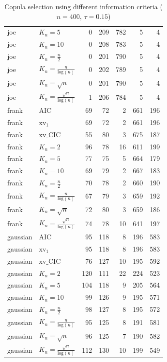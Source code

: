\begin{table}[htbp]
\begin{tabular}{llrrrrr}
  joe & $K_{n}=5$ & 0 & 209 & 782 & 5 & 4 \\ 
  joe & $K_{n}=10$ & 0 & 208 & 783 & 5 & 4 \\ 
  joe & $K_{n}=\tfrac{n}{2}$ & 0 & 201 & 790 & 5 & 4 \\ 
  joe & $K_{n}=\tfrac{n}{\text{log}(n)}$ & 0 & 202 & 789 & 5 & 4 \\ 
  joe & $K_{n}=\sqrt{n}$ & 0 & 201 & 790 & 5 & 4 \\ 
  joe & $K_{n}=\tfrac{\sqrt{n}}{\text{log}(n)}$ & 1 & 206 & 784 & 5 & 4 \\ 
   \hdashline
frank & AIC & 69 & 72 & 2 & 661 & 196 \\ 
  frank & $\text{xv}_{1}$ & 69 & 72 & 2 & 661 & 196 \\ 
  frank & $\text{xv}\_\text{CIC}$ & 55 & 80 & 3 & 675 & 187 \\ 
  frank & $K_{n}=2$ & 96 & 78 & 16 & 611 & 199 \\ 
  frank & $K_{n}=5$ & 77 & 75 & 5 & 664 & 179 \\ 
  frank & $K_{n}=10$ & 69 & 79 & 2 & 667 & 183 \\ 
  frank & $K_{n}=\tfrac{n}{2}$ & 70 & 78 & 2 & 660 & 190 \\ 
  frank & $K_{n}=\tfrac{n}{\text{log}(n)}$ & 67 & 79 & 3 & 659 & 192 \\ 
  frank & $K_{n}=\sqrt{n}$ & 72 & 80 & 3 & 659 & 186 \\ 
  frank & $K_{n}=\tfrac{\sqrt{n}}{\text{log}(n)}$ & 74 & 78 & 10 & 641 & 197 \\ 
   \hdashline
gaussian & AIC & 95 & 118 & 8 & 196 & 583 \\ 
  gaussian & $\text{xv}_{1}$ & 95 & 118 & 8 & 196 & 583 \\ 
  gaussian & $\text{xv}\_\text{CIC}$ & 76 & 127 & 10 & 195 & 592 \\ 
  gaussian & $K_{n}=2$ & 120 & 111 & 22 & 224 & 523 \\ 
  gaussian & $K_{n}=5$ & 104 & 118 & 9 & 205 & 564 \\ 
  gaussian & $K_{n}=10$ & 99 & 126 & 9 & 195 & 571 \\ 
  gaussian & $K_{n}=\tfrac{n}{2}$ & 98 & 127 & 8 & 195 & 572 \\ 
  gaussian & $K_{n}=\tfrac{n}{\text{log}(n)}$ & 95 & 125 & 8 & 191 & 581 \\ 
  gaussian & $K_{n}=\sqrt{n}$ & 96 & 125 & 7 & 190 & 582 \\ 
  gaussian & $K_{n}=\tfrac{\sqrt{n}}{\text{log}(n)}$ & 112 & 130 & 10 & 199 & 549 \\ 
   \hline
\end{tabular}
\caption{Copula selection using different information criteria ($n = 400$, $\tau = 0.15$)} 
\end{table}


